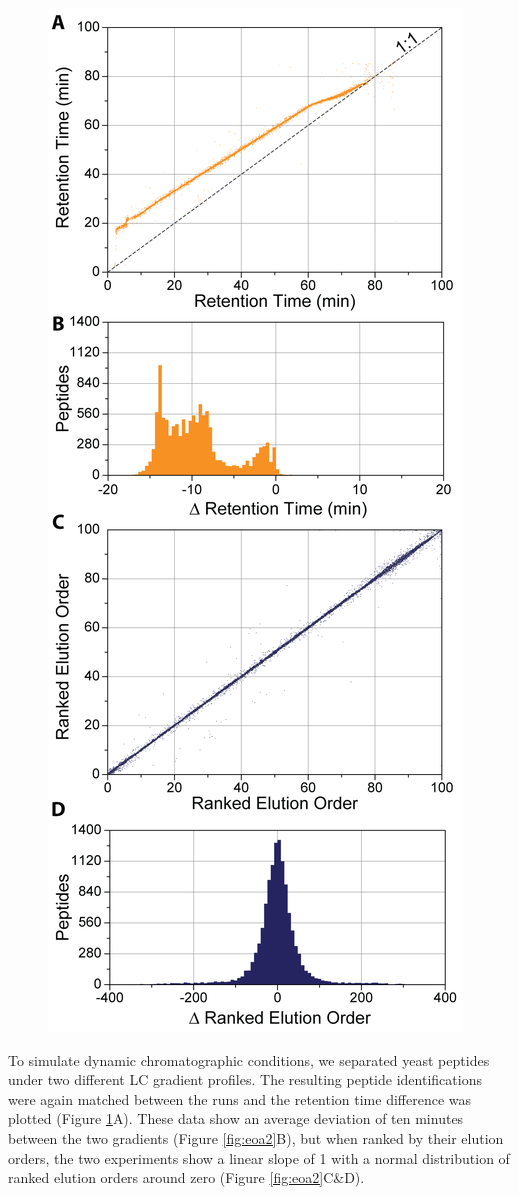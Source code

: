 \begin{figure}[p]
	\centering
	\includegraphics[width=0.5\columnwidth]{eoa/EOA S2.png}
	\label{fig:eoas2}
\end{figure}

To simulate dynamic chromatographic conditions, we separated yeast peptides under two different LC gradient profiles. The resulting peptide identifications were again matched between the runs and the retention time difference was plotted (Figure \ref{fig:eoas2}A). These data show an average deviation of ten minutes between the two gradients (Figure \ref{fig:eoa2}B), but when ranked by their elution orders, the two experiments show a linear slope of 1 with a normal distribution of ranked elution orders around zero (Figure \ref{fig:eoa2}C\&D). 

